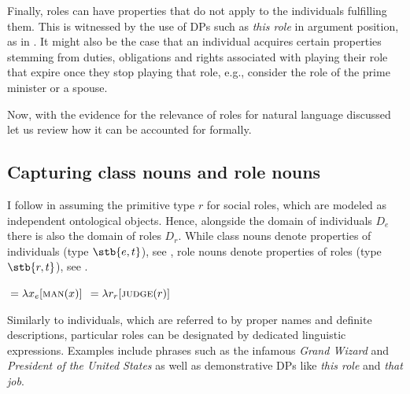 \documentclass[output=paper]{langscibook}
\begin{document}
		\ea\label{wan:ex:multiple-empty} \label{wan:ex:multiple}
		\label{wan:ex:empty}
        \z
        \z

\noindent Finally, roles can have properties that do not apply to the individuals fulfilling them. This is witnessed by the use of DPs such as \textit{this role} in argument position, as in . It might also be the case that an individual acquires certain properties stemming from duties, obligations and rights associated with playing their role that expire once they stop playing that role, e.g., consider the role of the prime minister or a spouse.

\label{wan:ex:this-role}
\z

\noindent Now, with the evidence for the relevance of roles for natural language discussed let us review how it can be accounted for formally.

\subsection{Capturing class nouns and role nouns}\label{wan:sec:capturing-class-nouns-and-role-nouns}

I follow \citet{zobel2017sensitivity} in assuming the primitive type $r$ for social roles, which are modeled as independent ontological objects. Hence, alongside the domain of individuals $D_e$ there is also the domain of roles $D_r$. While class nouns denote properties of individuals (type $\stb{e,t}$), see , role nouns denote properties of roles (type $\stb{r,t}$), see .

\ea \ea {}${ } = \lambda x_e[\textsc{man}(x)]$\label{wan:form:class}
\ex {}${ } = \lambda r_r[\textsc{judge}(r)]$\label{wan:form:role}
\z
\z

\noindent Similarly to individuals, which are referred to by proper names and definite descriptions, particular roles can be designated by dedicated linguistic expressions. Examples include phrases such as the infamous \textit{Grand Wizard} and \textit{President of the United States} as well as demonstrative DPs like \textit{this role} and \textit{that job}.
\end{document}
